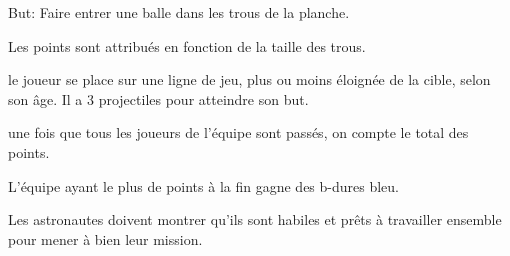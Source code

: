 \documentclass{grand-jeu}
\begin{document}
\begin{liste-materiel}
\end{liste-materiel}

\begin{regles}
But: Faire entrer une balle dans les trous de la planche.

Les points sont attribués en fonction de la taille des trous.

le joueur se place sur une ligne de jeu, plus ou moins éloignée de la cible, selon son âge. Il a 3 projectiles pour atteindre son but. 

une fois que tous les joueurs de l'équipe sont passés, on compte le total des points.

L'équipe ayant le plus de points à  la fin gagne des b-dures bleu.
\end{regles}

\begin{imaginaire}
Les astronautes doivent montrer qu'ils sont habiles et prêts à travailler ensemble pour mener à bien leur mission.  
\end{imaginaire}

\begin{moments-stop}
\end{moments-stop}
\end{document}
